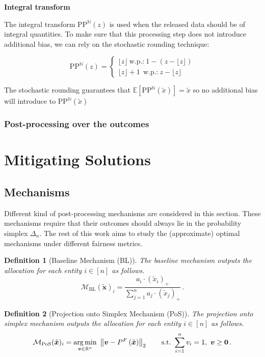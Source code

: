 \documentclass[9pt,lineno,twocolumn,twoside]{pnas-new}
\newtheorem{definition}{Definition}
\newcommand{\cM}{\mathcal{M}}
\newcommand{\noisyalloc}{\alloc{\noisydata}}
\newcommand{\noisydata}{\tilde{\bm{x}}}
\newcommand{\norm}[1]{\left\lVert#1\right\rVert}
\newcommand{\relu}[1]{\left(#1\right)_+}
\newcommand{\alloc}[1]{P^F\left(#1\right)}
\begin{document}
    \noindent \textbf{Integral transform}

    The integral transform $\text{PP}^{\mathbb{N}}(z)$ is used when the released data should be of integral quantities. To make sure that this processing step does not introduce additional bias, we can rely on the stochastic rounding technique:

    \begin{equation}
        \text{PP}^{\mathbb{N}}(z) = \begin{cases}
                                        \lfloor z \rfloor   \ \mbox{w.p.:} \  1 -(z- \lfloor z \rfloor ) \\
                                        \lfloor z \rfloor  +1 \ \ \mbox{w.p.:} \  z - \lfloor z \rfloor
        \end{cases}
    \end{equation}


    The stochastic rounding guarantees that $\mathbb{E} [\text{PP}^{\mathbb{N}}(\tilde{x})] = \tilde{x} $ so no additional bias will introduce to $\text{PP}^{\mathbb{N}}(\tilde{x})$


    \subsubsection*{Post-processing over the outcomes}

    \section*{Mitigating Solutions}
    \subsection*{Mechanisms}
    Different kind of post-processing mechanisms are considered in this section. These mechanisms
    require that
    their outcomes should always lie in the probability simplex $\Delta_n$. The rest of this work aims to study the (approximate) optimal mechanisms under different fairness metrics.
    \begin{definition}
        [Baseline Mechanism (BL)]
        The \emph{baseline mechanism} outputs the allocation for each entity $i\in [n]$ as follows.
        \begin{equation*}
            \cM_{\mathrm{BL}}(\noisydata)_i = \frac{a_i\cdot \relu{\tilde{x}_i}}{\sum_{j=1}^n a_j\cdot \relu{\tilde{x}_j}}\,.
        \end{equation*}
    \end{definition}

    \begin{definition}
        [Projection onto Simplex Mechanism (PoS)]
        The \emph{projection onto simplex mechanism} outputs the allocation for each entity $i\in [n]$ as follows.
        \begin{equation*}
            \cM_{\mathrm{PoS}}(\noisydata)_i= \underset{\bm{v}\in\RR^n}{\arg\min}~\norm{\bm{v}-\noisyalloc}_2\qquad\mathrm{s.t.}~
            \sum_{i=1}^n v_i = 1,~\bm{v}\geq \bm{0}\,.
        \end{equation*}
    \end{definition}


%   
%
\end{document}
